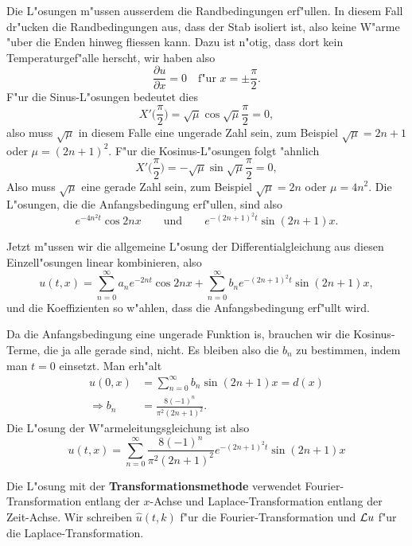 \begin{loesung}
Die L"osungen m"ussen ausserdem die Randbedingungen erf"ullen.
In diesem Fall dr"ucken die Randbedingungen aus, dass der Stab isoliert ist,
also keine W"arme "uber die Enden hinweg fliessen kann. Dazu ist n"otig,
dass dort kein Temperaturgef"alle herscht, wir haben also
\[\frac{\partial u}{\partial x}=0\quad\text{f"ur $x=\pm\frac{\pi}2$}.\]
F"ur die Sinus-L"osungen bedeutet dies
\[
X'\biggl(\frac{\pi}2\biggr)=\sqrt{\mu}\cos \sqrt{\mu}\frac{\pi}2=0,
\]
also muss $\sqrt{\mu}$ in diesem Falle eine ungerade Zahl sein,
zum Beispiel $\sqrt{\mu}=2n+1$ oder
$\mu=(2n+1)^2$.
F"ur die Kosinus-L"osungen folgt "ahnlich
\[
X'\biggl(\frac{\pi}2\biggr)=-\sqrt{\mu}\sin\sqrt{\mu}\frac{\pi}2=0,
\]
Also muss $\sqrt{\mu}$ eine gerade Zahl sein, zum Beispiel $\sqrt{\mu}=2n$ oder
$\mu=4n^2$.
Die L"osungen, die die Anfangsbedingung
erf"ullen, sind also
\[
e^{-4n^2t}\cos 2nx\qquad\text{und}\qquad e^{-(2n+1)^2t}\sin(2n+1)x.
\]

Jetzt m"ussen wir die allgemeine L"osung der Differentialgleichung aus
diesen Einzell"osungen linear kombinieren, also
\[
u(t,x)=
\sum_{n=0}^\infty a_ne^{-2nt}\cos 2nx +\sum_{n=0}^\infty b_n e^{-(2n+1)^2t}\sin(2n+1)x,
\]
und die Koeffizienten so w"ahlen, dass die Anfangsbedingung erf"ullt wird.

Da die Anfangsbedingung eine ungerade Funktion is, brauchen wir die Kosinus-Terme,
die ja alle gerade sind, nicht. Es bleiben also die $b_n$ zu bestimmen, indem
man $t=0$ einsetzt. Man erh"alt
\begin{align*}
u(0,x)&=\sum_{n=0}^\infty b_n\sin(2n+1)x=d(x)
\\
\Rightarrow
b_n&=\frac{8(-1)^n}{\pi^2(2n+1)^2}.
\end{align*}
Die L"osung der W"armeleitungsgleichung ist also
\[
u(t,x)=
\sum_{n=0}^\infty \frac{8(-1)^n}{\pi^2(2n+1)^2}e^{-(2n+1)^2t}\sin(2n+1)x
\]

Die L"osung mit der {\bf Transformationsmethode}
verwendet Fourier-Transformation
entlang der $x$-Achse und Laplace-Transformation entlang der Zeit-Achse.
Wir schreiben $\hat u(t,k)$ f"ur die Fourier-Transformation und ${\cal L} u$
f"ur die Laplace-Transformation.


\end{loesung}
